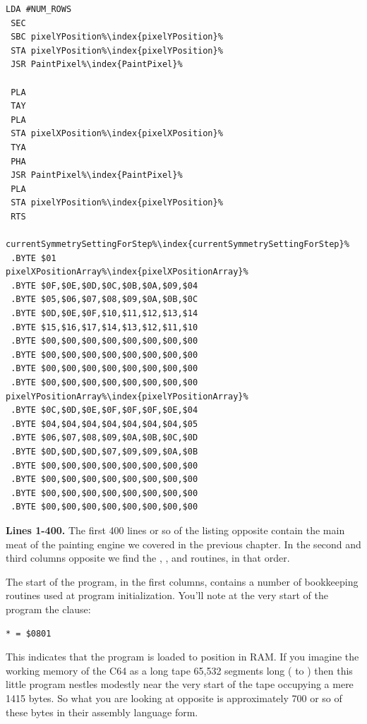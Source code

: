\begin{minipage}[b]{0.33\linewidth}
\begin{lrbox}{\mybox}
\begin{lstlisting}[basicstyle=\ttfamily\tiny,escapechar=\%]
 LDA #NUM_ROWS
 SEC 
 SBC pixelYPosition%\index{pixelYPosition}%
 STA pixelYPosition%\index{pixelYPosition}%
 JSR PaintPixel%\index{PaintPixel}%

 PLA 
 TAY 
 PLA 
 STA pixelXPosition%\index{pixelXPosition}%
 TYA 
 PHA 
 JSR PaintPixel%\index{PaintPixel}%
 PLA 
 STA pixelYPosition%\index{pixelYPosition}%
 RTS 

currentSymmetrySettingForStep%\index{currentSymmetrySettingForStep}%
 .BYTE $01
pixelXPositionArray%\index{pixelXPositionArray}%   
 .BYTE $0F,$0E,$0D,$0C,$0B,$0A,$09,$04
 .BYTE $05,$06,$07,$08,$09,$0A,$0B,$0C
 .BYTE $0D,$0E,$0F,$10,$11,$12,$13,$14
 .BYTE $15,$16,$17,$14,$13,$12,$11,$10
 .BYTE $00,$00,$00,$00,$00,$00,$00,$00
 .BYTE $00,$00,$00,$00,$00,$00,$00,$00
 .BYTE $00,$00,$00,$00,$00,$00,$00,$00
 .BYTE $00,$00,$00,$00,$00,$00,$00,$00
pixelYPositionArray%\index{pixelYPositionArray}%   
 .BYTE $0C,$0D,$0E,$0F,$0F,$0F,$0E,$04
 .BYTE $04,$04,$04,$04,$04,$04,$04,$05
 .BYTE $06,$07,$08,$09,$0A,$0B,$0C,$0D
 .BYTE $0D,$0D,$0D,$07,$09,$09,$0A,$0B
 .BYTE $00,$00,$00,$00,$00,$00,$00,$00
 .BYTE $00,$00,$00,$00,$00,$00,$00,$00
 .BYTE $00,$00,$00,$00,$00,$00,$00,$00
 .BYTE $00,$00,$00,$00,$00,$00,$00,$00
\end{lstlisting}
\end{lrbox}%
\scalebox{0.8}{\usebox{\mybox}}
\end{minipage}
\clearpage
\textbf{Lines 1-400. } The first 400 lines or so of the listing opposite
contain the main meat of the painting engine we covered in the previous chapter. In the second
and third columns opposite we find the , ,
and  routines, in that order.

The start of the program, in the first columns, contains a number of bookkeeping routines used
at program initialization. You'll note at the very start of the program the clause:
\begin{lstlisting}[escapechar=\%]
* = $0801
\end{lstlisting}
This indicates that the program is loaded to position  in RAM. If you imagine the
working memory of the C64 as a long tape 65,532 segments long ( to ) then
this little program nestles modestly near the very start of the tape occupying a mere 1415 bytes. So
what you are looking at opposite is approximately 700 or so of these bytes in their assembly language
form.


